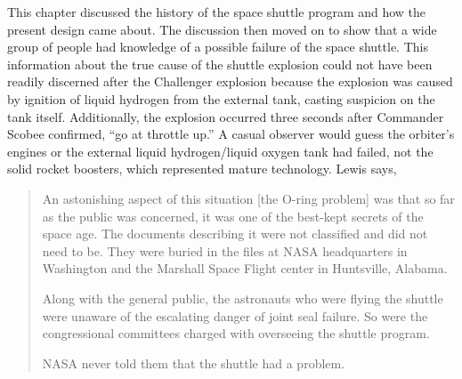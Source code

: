 This chapter discussed the history of the space shuttle program and how the present design came about. The discussion then moved on to show that a wide group of people had knowledge of a possible failure of the space shuttle. This information about the true cause of the shuttle explosion could not have been readily discerned after the Challenger explosion because the explosion was caused by ignition of liquid hydrogen from the external tank, casting suspicion on the tank itself. Additionally, the explosion occurred three seconds after Commander Scobee confirmed, ``go at throttle up.'' A casual observer would guess the orbiter's engines or the external liquid hydrogen/liquid oxygen tank had failed, not the solid rocket boosters, which represented mature technology. Lewis says,

\begin{singlespace}
\begin{quotation}
\noindent
An astonishing aspect of this situation [the O-ring problem] was that so far as the public was concerned, it was one of the best-kept secrets of the space age. The documents describing it were not classified and did not need to be. They were buried in the files at NASA headquarters in Washington and the Marshall Space Flight center in Huntsville, Alabama.\par
\bigskip
\noindent
Along with the general public, the astronauts who were flying the shuttle were unaware of the escalating danger of joint seal failure. So were the congressional committees charged with overseeing the shuttle program.\par
\bigskip
\noindent
NASA never told them that the shuttle had a problem.
\end{quotation}
\end{singlespace}

